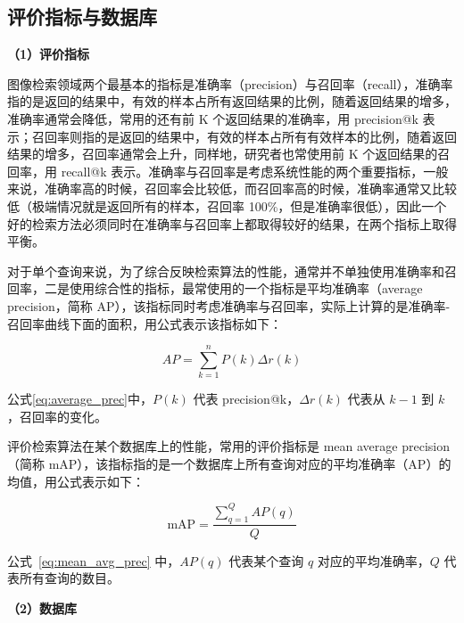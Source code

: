 \subsection{评价指标与数据库}

\noindent\textbf{（1）评价指标}

图像检索领域两个最基本的指标是准确率（precision）与召回率（recall），准确率指的是返回的结果中，有效的样本占所有返回结果的比例，随着返回结果的增多，准确率通常会降低，常用的还有前 K 个返回结果的准确率，用 precision@k 表示；召回率则指的是返回的结果中，有效的样本占所有有效样本的比例，随着返回结果的增多，召回率通常会上升，同样地，研究者也常使用前 K 个返回结果的召回率，用 recall@k 表示。准确率与召回率是考虑系统性能的两个重要指标，一般来说，准确率高的时候，召回率会比较低，而召回率高的时候，准确率通常又比较低（极端情况就是返回所有的样本，召回率 100\%，但是准确率很低），因此一个好的检索方法必须同时在准确率与召回率上都取得较好的结果，在两个指标上取得平衡。

对于单个查询来说，为了综合反映检索算法的性能，通常并不单独使用准确率和召回率，二是使用综合性的指标，最常使用的一个指标是平均准确率（average precision，简称 AP），该指标同时考虑准确率与召回率，实际上计算的是准确率-召回率曲线下面的面积，用公式表示该指标如下：

\begin{equation}\label{eq:average_prec}
AP = \sum_{k=1}^{n}P(k)\Delta r(k)
\end{equation}

公式\ref{eq:average_prec}中，$P(k)$ 代表 precision@k，$\Delta r(k)$ 代表从 $k-1$ 到 $k$，召回率的变化。

评价检索算法在某个数据库上的性能，常用的评价指标是 mean average precision（简称 mAP），该指标指的是一个数据库上所有查询对应的平均准确率（AP）的均值，用公式表示如下：

\begin{equation}\label{eq:mean_avg_prec}
\text{mAP} = \frac{\sum_{q=1}^{Q}AP(q)}{Q}
\end{equation}

公式~\ref{eq:mean_avg_prec} 中，$AP(q)$ 代表某个查询 $q$ 对应的平均准确率，$Q$ 代表所有查询的数目。

\noindent\textbf{（2）数据库}

